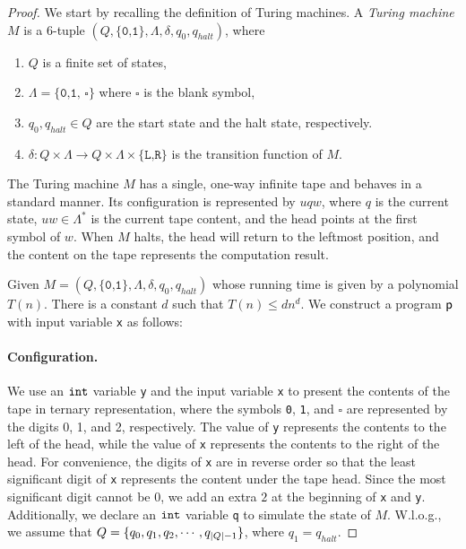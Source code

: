\documentclass[runningheads]{llncs}
\begin{document}
\begin{proof}
We start by recalling the definition of Turing machines.
A \textit{Turing machine} $M$ is a $6$-tuple $(Q, \{\texttt{0,1}\}, \Lambda, \delta, q_0, q_{halt})$, where
\begin{enumerate}
    \item $Q$ is a finite set of states,
    \item $\Lambda=\{\texttt{0,1, $\square$}\}$ where \texttt{$\square$} is the blank symbol,
    \item $q_0,q_{halt}\in Q$ are the start state and the halt state, respectively.
    \item $\delta:Q\times\Lambda\to Q\times\Lambda\times\{\texttt{L,R}\}$ is the transition function of $M$.
\end{enumerate}

The Turing machine $M$ has a single, one-way infinite tape and behaves in a standard manner.
Its configuration is represented by $uqw$, where $q$ is the current state, $uw\in\Lambda^{*}$ is the current tape content, and the head points at the first symbol of $w$.
When $M$ halts, the head will return to the leftmost position, and the content on the tape represents the computation result.

Given $M=(Q, \{\texttt{0,1}\}, \Lambda, \delta, q_0, q_{halt})$ whose running time is given by a polynomial $T(n)$.
There is a constant $d$ such that $T(n)\le dn^d$. We construct a program $\mathsf{p}$  with input variable \texttt{x} as follows:

\paragraph{Configuration.} We use an $\mathtt{int}$ variable \texttt{y} and the input variable \texttt{x} to present the contents of the tape in ternary representation, where the symbols \texttt{0}, \texttt{1}, and \texttt{$\square$} are represented by the digits 0, 1, and 2, respectively.
The value of \texttt{y} represents the contents to the left of the head, while the value of \texttt{x} represents the contents to the right of the head.
For convenience, the digits of \texttt{x} are in reverse order so that the least significant digit of \texttt{x} represents the content under the tape head.
Since the most significant digit cannot be $0$, we add an extra $2$ at the beginning of \texttt{x} and \texttt{y}.
Additionally, we declare an $\mathtt{int}$ variable \texttt{q} to simulate the state of $M$.
W.l.o.g., we assume that $Q=\{q_0,q_1,q_2,\cdots,q_{\vert Q\vert-1}\}$, where $q_1=q_{halt}$.


\end{proof}
\end{document}
